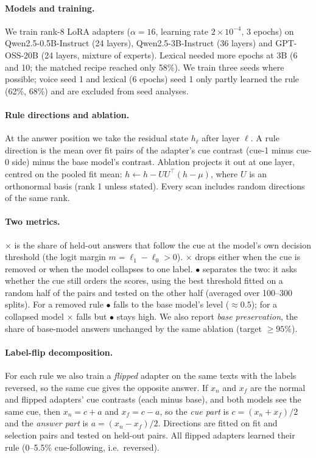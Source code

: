 \documentclass[11pt]{article}
\newcommand{\xm}{$\times$}
\newcommand{\dm}{$\bullet$}
\begin{document}
\paragraph{Models and training.} We train rank-8 LoRA adapters ($\alpha=16$, learning rate $2\times10^{-4}$, 3 epochs) on Qwen2.5-0.5B-Instruct (24 layers), Qwen2.5-3B-Instruct (36 layers) and GPT-OSS-20B (24 layers, mixture of experts). Lexical needed more epochs at 3B (6 and 10; the matched recipe reached only 58\%). We train three seeds where possible; voice seed 1 and lexical (6 epochs) seed 1 only partly learned the rule (62\%, 68\%) and are excluded from seed analyses.

\paragraph{Rule directions and ablation.} At the answer position we take the residual state $h_\ell$ after layer $\ell$. A rule direction is the mean over fit pairs of the adapter's cue contrast (cue-1 minus cue-0 side) minus the base model's contrast. Ablation projects it out at one layer, centred on the pooled fit mean: $h \leftarrow h - UU^\top(h-\mu)$, where $U$ is an orthonormal basis (rank 1 unless stated). Every scan includes random directions of the same rank.

\paragraph{Two metrics.} \xm{} is the share of held-out answers that follow the cue at the model's own decision threshold (the logit margin $m=\ell_1-\ell_0>0$). \xm{} drops either when the cue is removed or when the model collapses to one label. \dm{} separates the two: it asks whether the cue still orders the scores, using the best threshold fitted on a random half of the pairs and tested on the other half (averaged over 100--300 splits). For a removed rule \dm{} falls to the base model's level ($\approx0.5$); for a collapsed model \xm{} falls but \dm{} stays high. We also report \emph{base preservation}, the share of base-model answers unchanged by the same ablation (target $\geq95\%$).

\paragraph{Label-flip decomposition.} For each rule we also train a \emph{flipped} adapter on the same texts with the labels reversed, so the same cue gives the opposite answer. If $x_n$ and $x_f$ are the normal and flipped adapters' cue contrasts (each minus base), and both models see the same cue, then $x_n = c + a$ and $x_f = c - a$, so the \emph{cue part} is $c=(x_n+x_f)/2$ and the \emph{answer part} is $a=(x_n-x_f)/2$. Directions are fitted on fit and selection pairs and tested on held-out pairs. All flipped adapters learned their rule (0--5.5\% cue-following, i.e.\ reversed).
\end{document}
